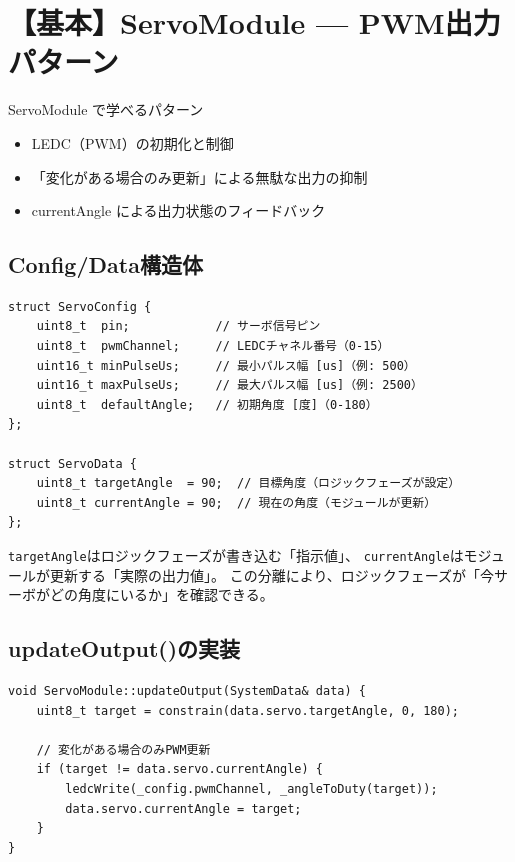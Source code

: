 \section{【基本】ServoModule — PWM出力パターン}

\begin{patternbox}{ServoModule で学べるパターン}
\begin{itemize}
    \item LEDC（PWM）の初期化と制御
    \item 「変化がある場合のみ更新」による無駄な出力の抑制
    \item currentAngle による出力状態のフィードバック
\end{itemize}
\end{patternbox}

\subsection{Config/Data構造体}

\begin{lstlisting}[style=cppstyle, caption={ServoModule.h — Config/Data}]
struct ServoConfig {
    uint8_t  pin;            // サーボ信号ピン
    uint8_t  pwmChannel;     // LEDCチャネル番号（0-15）
    uint16_t minPulseUs;     // 最小パルス幅 [us]（例: 500）
    uint16_t maxPulseUs;     // 最大パルス幅 [us]（例: 2500）
    uint8_t  defaultAngle;   // 初期角度 [度]（0-180）
};

struct ServoData {
    uint8_t targetAngle  = 90;  // 目標角度（ロジックフェーズが設定）
    uint8_t currentAngle = 90;  // 現在の角度（モジュールが更新）
};
\end{lstlisting}

\begin{pointbox}[targetとcurrentの分離]
\texttt{targetAngle}はロジックフェーズが書き込む「指示値」、
\texttt{currentAngle}はモジュールが更新する「実際の出力値」。
この分離により、ロジックフェーズが「今サーボがどの角度にいるか」を確認できる。
\end{pointbox}

\subsection{updateOutput()の実装}

\begin{lstlisting}[style=cppstyle, caption={ServoModule.cpp — updateOutput()}]
void ServoModule::updateOutput(SystemData& data) {
    uint8_t target = constrain(data.servo.targetAngle, 0, 180);

    // 変化がある場合のみPWM更新
    if (target != data.servo.currentAngle) {
        ledcWrite(_config.pwmChannel, _angleToDuty(target));
        data.servo.currentAngle = target;
    }
}
\end{lstlisting}

